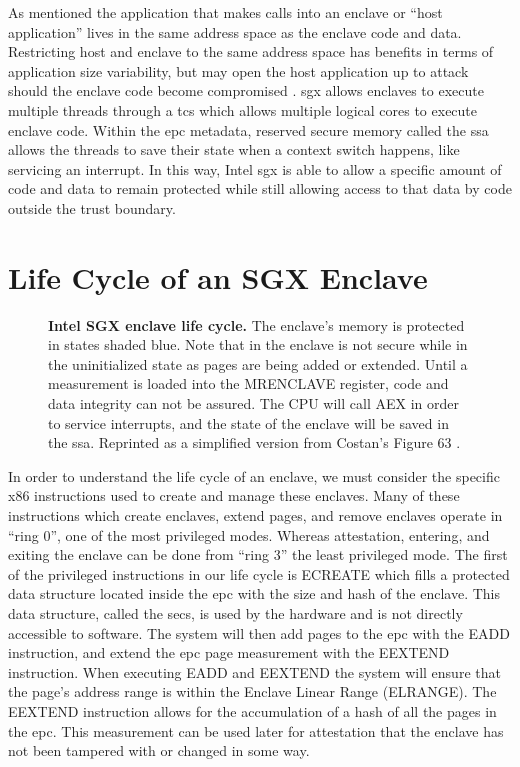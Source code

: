 As mentioned the application that makes calls into an enclave or ``host application'' lives in the same address space as the enclave code and data. Restricting host and enclave to the same address space has benefits in terms of application size variability, but may open the host application up to attack should the enclave code become compromised \cite{schwarz2019practical}.  \gls{sgx} allows enclaves to execute multiple threads through a \gls{tcs} which allows multiple logical cores to execute enclave code. Within the \gls{epc} metadata, reserved secure memory called the \gls{ssa} allows the threads to save their state when a context switch happens, like servicing an interrupt. In this way, Intel \gls{sgx} is able to allow a specific amount of code and data to remain protected while still allowing access to that data by code outside the trust boundary.

\section{Life Cycle of an SGX Enclave}

\begin{figure}[ht]
\makebox[\textwidth][c]{}
\caption[Intel SGX Enclave Lifecycle]{\textbf{Intel SGX enclave life cycle.} The enclave's memory is protected in states shaded blue. Note that in the enclave is not secure while in the uninitialized state as pages are being added or extended. Until a measurement is loaded into the MRENCLAVE register, code and data integrity can not be assured. The CPU will call AEX in order to service interrupts, and the state of the enclave will be saved in the \gls{ssa}. Reprinted as a simplified version from Costan's Figure 63 \cite{Costan2016}.\label{figure:sgx-enclave-life-cycle}}
\end{figure}

In order to understand the life cycle of an enclave, we must consider the specific x86 instructions used to create and manage these enclaves. Many of these instructions which create enclaves, extend pages, and remove enclaves operate in ``\gls{ring} 0'', one of the most privileged modes. Whereas attestation, entering, and exiting the enclave can be done from ``\gls{ring} 3'' the least privileged mode. The first of the privileged instructions in our life cycle is ECREATE which fills a protected data structure located inside the \gls{epc} with the size and hash of the enclave. This data structure, called the \gls{secs}, is used by the hardware and is not directly accessible to software. The system will then add pages to the \gls{epc} with the EADD instruction, and extend the \gls{epc} page \gls{measurement} with the EEXTEND instruction. When executing EADD and EEXTEND the system will ensure that the page's address range is within the Enclave Linear Range (ELRANGE). The EEXTEND instruction allows for the accumulation of a hash of all the pages in the \gls{epc}. This measurement can be used later for \gls{attestation} that the enclave has not been tampered with or changed in some way.

